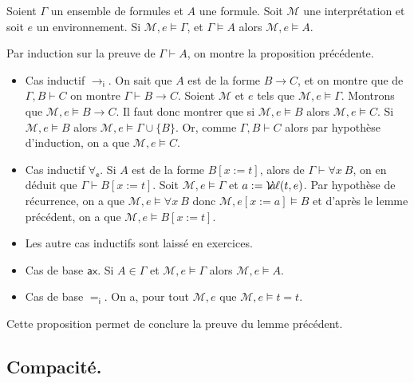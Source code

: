 \documentclass[./main]{subfiles}
\begin{document}
  \begin{prop}
    Soient $\Gamma$ un ensemble de formules et $A$ une formule.
    Soit $\mathcal{M}$ une interprétation et soit $e$ un environnement.
    Si $\mathcal{M}, e \models \Gamma$, et $\Gamma \models A$ alors  $\mathcal{M}, e \models A$.
  \end{prop}
  \begin{prv}
    Par induction sur la preuve de $\Gamma \vdash A$, on montre la proposition précédente.

    \begin{itemize}
      \item Cas inductif $\to_\mathsf{i}$.
        On sait que $A$ est de la forme $B \to C$, et on montre que de $\Gamma, B \vdash C$ on montre $\Gamma \vdash B \to C$.
        Soient $\mathcal{M}$ et $e$ tels que $\mathcal{M}, e \models \Gamma$.
        Montrons que $\mathcal{M}, e \models B \to C$.
        Il faut donc montrer que si $\mathcal{M}, e \models B$ alors $\mathcal{M}, e \models C$.
        Si $\mathcal{M}, e \models B$ alors $\mathcal{M}, e \models \Gamma \cup \{B\}$.
        Or, comme $\Gamma, B \vdash C$ alors par hypothèse d'induction, on a que $\mathcal{M}, e \models C$.
      \item Cas inductif $\forall_\mathsf{e}$.
        Si $A$ est de la forme $B[x := t]$, alors de $\Gamma \vdash \forall x \: B$, on en déduit que $\Gamma \vdash B[x := t]$.
        Soit $\mathcal{M}, e \models \Gamma$ et $a := \mathcal{V}\hspace{-3.5pt}a\hspace{-0.5pt}\ell(t, e)$. Par hypothèse de récurrence, on a que  $\mathcal{M}, e \models \forall x \: B$ donc $\mathcal{M}, e[x := a] \models B$ et d'après le lemme précédent, on a que $\mathcal{M}, e \models B[x := t]$.
      \item Les autre cas inductifs sont laissé en exercices.
      \item Cas de base $\mathsf{ax}$.
        Si $A \in \Gamma$ et $\mathcal{M}, e \models \Gamma$ alors $\mathcal{M}, e \models A$.
      \item Cas de base $=_\mathsf{i}$.
        On a, pour tout $\mathcal{M}, e$ que $\mathcal{M}, e \models t = t$.
    \end{itemize}
    \vspace{-\baselineskip}
  \end{prv}
  Cette proposition permet de conclure la preuve du lemme précédent.

  \subsection{Compacité.}
\end{document}
